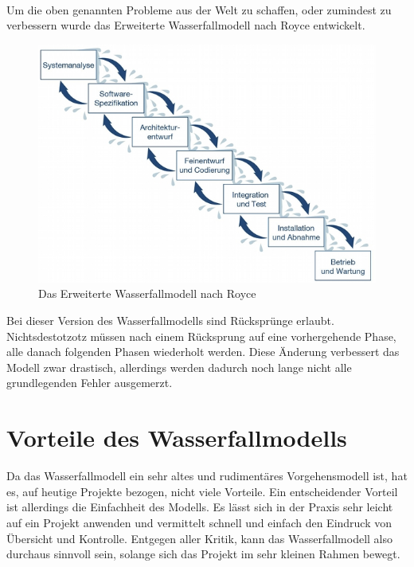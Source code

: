 \documentclass[a4paper, twopage]{scrreprt}
\begin{document}
\paragraph*{}
Um die oben genannten Probleme aus der Welt zu schaffen, oder zumindest zu verbessern wurde das Erweiterte Wasserfallmodell nach Royce entwickelt.
\begin{figure}[h]
\centering
	\includegraphics[scale=0.6]{Images/wasserfallmodell_erweitert}
	\caption[Erweitertes Wasserfallmodell]{Das Erweiterte Wasserfallmodell nach Royce\cite{scrumkompakt:wasserfallmodell}}
	\label{fig:wasserfallmodell_erweitert}
\end{figure}
Bei dieser Version des Wasserfallmodells sind Rücksprünge erlaubt. Nichtsdestotzotz müssen nach einem Rücksprung auf eine vorhergehende Phase, alle danach folgenden Phasen wiederholt werden. Diese Änderung verbessert das Modell zwar drastisch, allerdings werden dadurch noch lange nicht alle grundlegenden Fehler ausgemerzt.
\section{Vorteile des Wasserfallmodells}
\label{sec:wasserfallmodell_vorteile}
Da das Wasserfallmodell ein sehr altes und rudimentäres Vorgehensmodell ist, hat es, auf heutige Projekte bezogen, nicht viele Vorteile. \newline 
Ein entscheidender Vorteil ist allerdings die Einfachheit des Modells. Es lässt sich in der Praxis sehr leicht auf ein Projekt anwenden und vermittelt schnell und einfach den Eindruck von Übersicht und Kontrolle. Entgegen aller Kritik, kann das Wasserfallmodell also durchaus sinnvoll sein, solange sich das Projekt im sehr kleinen Rahmen bewegt.
\end{document}
